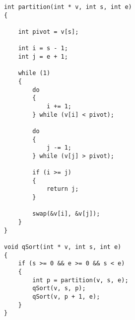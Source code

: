 \begin{lstlisting}[style=CStyle]
int partition(int * v, int s, int e)
{

    int pivot = v[s];

    int i = s - 1;
    int j = e + 1;

    while (1)
    {
        do
        {
            i += 1;
        } while (v[i] < pivot);

        do
        {
            j -= 1;
        } while (v[j] > pivot);
        
        if (i >= j)
        {
            return j;
        }

        swap(&v[i], &v[j]);
    }
}

void qSort(int * v, int s, int e)
{
    if (s >= 0 && e >= 0 && s < e)
    {
        int p = partition(v, s, e);
        qSort(v, s, p);
        qSort(v, p + 1, e);
    }
}
\end{lstlisting}